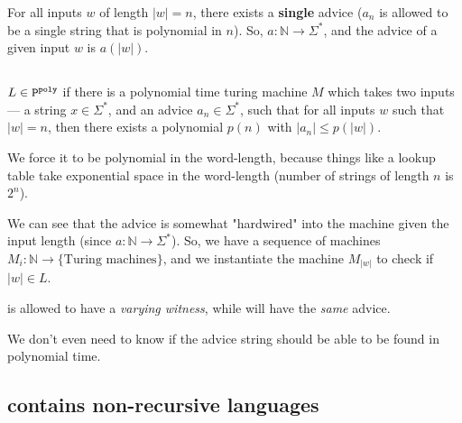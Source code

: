 For all inputs $w$ of length $|w| = n$, there exists a \textbf{single} advice
($a_n$ is allowed to be a single string that is polynomial in $n$).
So, $a: \mathbb{N} \to \Sigma^*$, and the advice of a given input $w$ is $a(|w|)$.


\subsection{\ppoly}

$L \in \text{$\texttt{P}^{\texttt{poly}}$}$ if there is a polynomial time turing machine $M$ which
takes two inputs --- a string $x \in \Sigma^*$, and an advice $a_n \in \Sigma^*$,
such that for all inputs $w$ such that $|w| = n$, then there exists a polynomial
$p(n)$ with $|a_n| \leq p(|w|)$.

We force it to be polynomial in the word-length, because things like a lookup
table take exponential space in the word-length (number of strings of length $n$
is $2^n$).

We can see that the advice is somewhat "hardwired" into the machine given
the input length (since $a: \mathbb{N} \to \Sigma^*$). So, we have a 
sequence of machines $M_i: \mathbb{N} \to \{ \text{Turing machines} \}$, and we instantiate
the machine $M_{|w|}$ to check if $|w| \in L$.

\nptime is allowed to have a \textit{varying witness}, while \ppoly will have
the \textit{same} advice.

We don't even need to know if the advice string should be able to be found
in polynomial time.

\subsection{\ppoly contains non-recursive languages}
